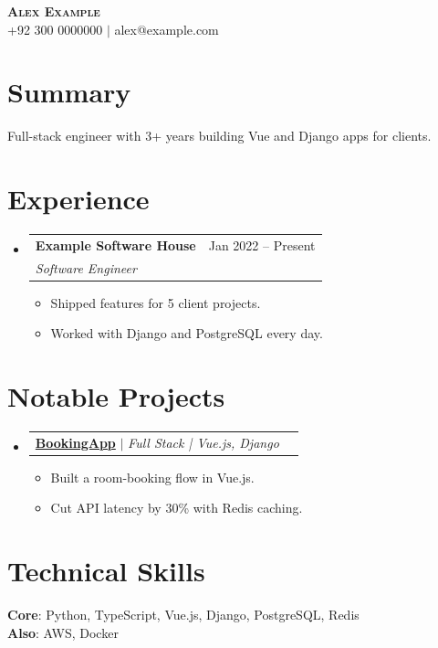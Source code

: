\documentclass[letterpaper,11pt]{article}
\makeatletter
\newcommand{\resumeItem}[1]{\item\small{{#1 \vspace{-2pt}}}}
\newcommand{\resumeSubheading}[4]{
  \vspace{-2pt}\item
  \begin{tabular*}{0.97\textwidth}[t]{l@{\extracolsep{\fill}}r}
    \textbf{#1} & #2 \\
    \textit{\small#3} & \textit{\small#4} \\
  \end{tabular*}\vspace{-7pt}
}
\newcommand{\resumeProjectHeading}[2]{
  \item
  \begin{tabular*}{0.97\textwidth}{l@{\extracolsep{\fill}}r}
    \small#1 & #2 \\
  \end{tabular*}\vspace{-7pt}
}
\newcommand{\resumeItemListStart}{\begin{itemize}}
\newcommand{\resumeItemListEnd}{\end{itemize}\vspace{-5pt}}
\newcommand{\resumeSubHeadingListStart}{\begin{itemize}[leftmargin=0.15in, label={}]}
\newcommand{\resumeSubHeadingListEnd}{\end{itemize}}
\makeatother
\begin{document}
\begin{center}
    \textbf{\Huge \scshape Alex Example} \\ \vspace{1pt}
    \small +92 300 0000000 $|$ alex@example.com
\end{center}
\section{Summary}
\begin{itemize}[leftmargin=0.15in, label={}]
\small{\item{
Full-stack engineer with 3+ years building Vue and Django apps for clients.
}}
\end{itemize}
\section{Experience}
\resumeSubHeadingListStart
  \resumeSubheading
  {Example Software House}{Jan 2022 -- Present}{Software Engineer}{}
  \resumeItemListStart
    \resumeItem{Shipped features for 5 client projects.}
    \resumeItem{Worked with Django and PostgreSQL every day.}
  \resumeItemListEnd
\resumeSubHeadingListEnd
\section{Notable Projects}
\resumeSubHeadingListStart
  \resumeProjectHeading{\textbf{\href{https://example.com/}{BookingApp}} $|$ \emph{Full Stack | Vue.js, Django}}{}
  \resumeItemListStart
    \resumeItem{Built a room-booking flow in Vue.js.}
    \resumeItem{Cut API latency by 30\% with Redis caching.}
  \resumeItemListEnd
\resumeSubHeadingListEnd
\section{Technical Skills}
\begin{itemize}[leftmargin=0.15in, label={}]
  \small{\item{
   \textbf{Core}{: Python, TypeScript, Vue.js, Django, PostgreSQL, Redis} \\
   \textbf{Also}{: AWS, Docker}
  }}
\end{itemize}
\end{document}
